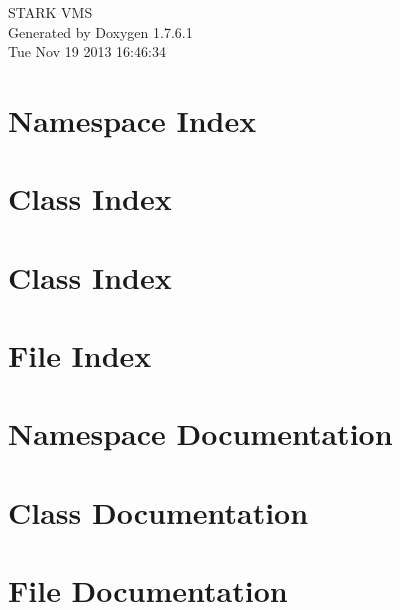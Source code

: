 \documentclass[a4paper]{book}
\begin{document}
\hypersetup{pageanchor=false,citecolor=blue}
\begin{titlepage}
\vspace*{7cm}
\begin{center}
{\Large \-S\-T\-A\-R\-K \-V\-M\-S }\\
\vspace*{1cm}
{\large \-Generated by Doxygen 1.7.6.1}\\
\vspace*{0.5cm}
{\small Tue Nov 19 2013 16:46:34}\\
\end{center}
\end{titlepage}
\clearemptydoublepage
{}
\tableofcontents
\clearemptydoublepage
{}
\hypersetup{pageanchor=true,citecolor=blue}
\chapter{\-Namespace \-Index}

\chapter{\-Class \-Index}

\chapter{\-Class \-Index}

\chapter{\-File \-Index}

\chapter{\-Namespace \-Documentation}


\chapter{\-Class \-Documentation}










\chapter{\-File \-Documentation}










\printindex
\end{document}
